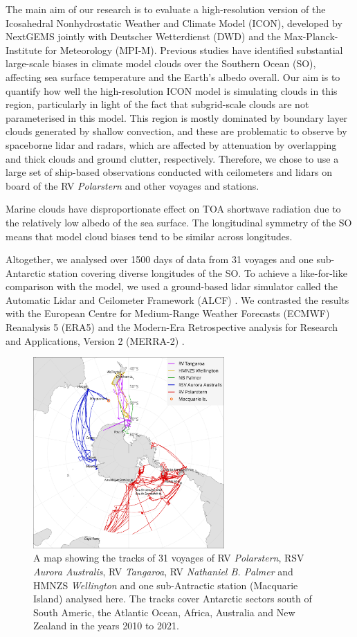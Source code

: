 \documentclass[12pt,a4paper]{article}
\begin{document}
The main aim of our research is to evaluate a high-resolution version of the
Icosahedral Nonhydrostatic Weather and Climate Model (ICON), developed by
NextGEMS jointly with Deutscher Wetterdienst (DWD) and the Max-Planck-Institute
for Meteorology (MPI-M). Previous studies have identified substantial
large-scale biases in climate model clouds over the Southern Ocean (SO), affecting
sea surface temperature and the Earth’s albedo overall. Our aim is to quantify
how well the high-resolution ICON model is simulating clouds in this region,
particularly in light of the fact that subgrid-scale clouds are not
parameterised in this model. This region is mostly dominated by boundary layer
clouds generated by shallow convection, and these are problematic to observe by
spaceborne lidar and radars, which are affected by attenuation by overlapping
and thick clouds and ground clutter, respectively. Therefore, we chose to use
a large set of ship-based observations conducted with ceilometers and lidars on
board of the RV \emph{Polarstern} and other voyages and stations.

Marine clouds have disproportionate effect on TOA shortwave radiation due to
the relatively low albedo of the sea surface. The longitudinal symmetry of the
SO means that model cloud biases tend to be similar across
longitudes.

Altogether, we analysed over 1500 days of data from 31 voyages and one
sub-Antarctic station covering diverse longitudes of the SO. To
achieve a like-for-like comparison with the model, we used a ground-based lidar
simulator called the Automatic Lidar and Ceilometer Framework (ALCF)
\citep{kuma2021}. We contrasted the results with the European Centre for
Medium-Range Weather Forecasts (ECMWF) Reanalysis 5 (ERA5) \citep{era5} and the
Modern-Era Retrospective analysis for Research and Applications, Version 2
(MERRA-2) \citep{gelaro2017}.

\begin{figure}
\centering
\includegraphics[width=0.65\textwidth]{img/map.png}
\caption{A map showing the tracks of 31 voyages of RV \emph{Polarstern}, RSV \emph{Aurora Australis}, RV \emph{Tangaroa}, RV \emph{Nathaniel B. Palmer} and HMNZS \emph{Wellington} and one sub-Antractic station (Macquarie Island) analysed here. The tracks cover Antarctic sectors south of South Americ, the Atlantic Ocean, Africa, Australia and New Zealand in the years 2010 to 2021.}
\label{fig:map}
\end{figure}
\end{document}
